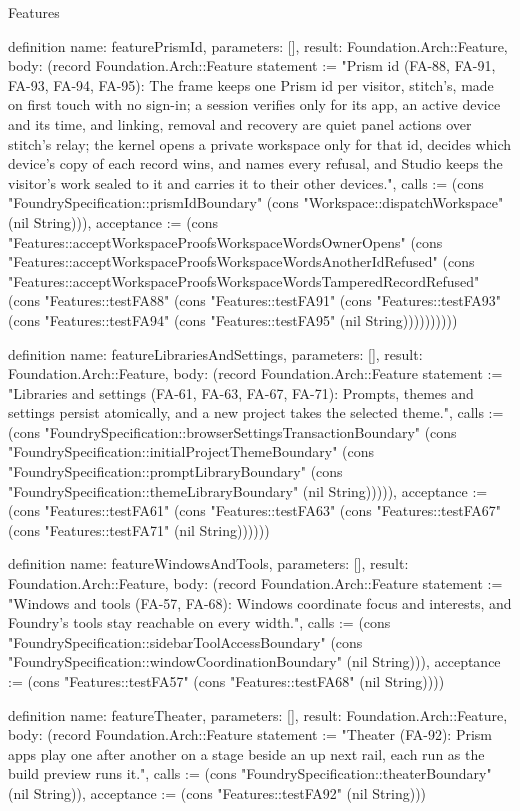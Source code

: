 \begin{lexlean}{Features}
\begin{semanticmodule}
definition{
  name: featurePrismId,
  parameters: [],
  result: Foundation.Arch::Feature,
  body: (record Foundation.Arch::Feature {statement := "Prism id (FA-88, FA-91, FA-93, FA-94, FA-95): The frame keeps one Prism id per visitor, stitch's, made on first touch with no sign-in; a session verifies only for its app, an active device and its time, and linking, removal and recovery are quiet panel actions over stitch's relay; the kernel opens a private workspace only for that id, decides which device's copy of each record wins, and names every refusal, and Studio keeps the visitor's work sealed to it and carries it to their other devices.", calls := (cons "FoundrySpecification::prismIdBoundary" (cons "Workspace::dispatchWorkspace" (nil String))), acceptance := (cons "Features::acceptWorkspaceProofsWorkspaceWordsOwnerOpens" (cons "Features::acceptWorkspaceProofsWorkspaceWordsAnotherIdRefused" (cons "Features::acceptWorkspaceProofsWorkspaceWordsTamperedRecordRefused" (cons "Features::testFA88" (cons "Features::testFA91" (cons "Features::testFA93" (cons "Features::testFA94" (cons "Features::testFA95" (nil String)))))))))})
}

definition{
  name: featureLibrariesAndSettings,
  parameters: [],
  result: Foundation.Arch::Feature,
  body: (record Foundation.Arch::Feature {statement := "Libraries and settings (FA-61, FA-63, FA-67, FA-71): Prompts, themes and settings persist atomically, and a new project takes the selected theme.", calls := (cons "FoundrySpecification::browserSettingsTransactionBoundary" (cons "FoundrySpecification::initialProjectThemeBoundary" (cons "FoundrySpecification::promptLibraryBoundary" (cons "FoundrySpecification::themeLibraryBoundary" (nil String))))), acceptance := (cons "Features::testFA61" (cons "Features::testFA63" (cons "Features::testFA67" (cons "Features::testFA71" (nil String)))))})
}

definition{
  name: featureWindowsAndTools,
  parameters: [],
  result: Foundation.Arch::Feature,
  body: (record Foundation.Arch::Feature {statement := "Windows and tools (FA-57, FA-68): Windows coordinate focus and interests, and Foundry's tools stay reachable on every width.", calls := (cons "FoundrySpecification::sidebarToolAccessBoundary" (cons "FoundrySpecification::windowCoordinationBoundary" (nil String))), acceptance := (cons "Features::testFA57" (cons "Features::testFA68" (nil String)))})
}

definition{
  name: featureTheater,
  parameters: [],
  result: Foundation.Arch::Feature,
  body: (record Foundation.Arch::Feature {statement := "Theater (FA-92): Prism apps play one after another on a stage beside an up next rail, each run as the build preview runs it.", calls := (cons "FoundrySpecification::theaterBoundary" (nil String)), acceptance := (cons "Features::testFA92" (nil String))})
}


\end{semanticmodule}
\end{lexlean}
